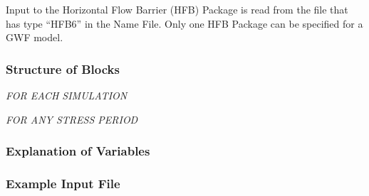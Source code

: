 Input to the Horizontal Flow Barrier (HFB) Package is read from the file that has type ``HFB6'' in the Name File.  Only one HFB Package can be specified for a GWF model.

\vspace{5mm}
\subsubsection{Structure of Blocks}
\vspace{5mm}

\noindent \textit{FOR EACH SIMULATION}


\vspace{5mm}
\noindent \textit{FOR ANY STRESS PERIOD}


\vspace{5mm}
\subsubsection{Explanation of Variables}
\begin{description}

\end{description}

\vspace{5mm}
\subsubsection{Example Input File}

